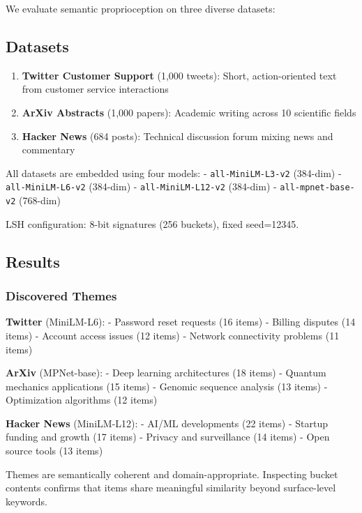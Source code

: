 \documentclass[
]{article}
\providecommand{\tightlist}{%
  \setlength{\itemsep}{0pt}\setlength{\parskip}{0pt}}
\begin{document}
We evaluate semantic proprioception on three diverse datasets:

\subsection{Datasets}\label{datasets}

\begin{enumerate}
\def\labelenumi{\arabic{enumi}.}
\tightlist
\item
  \textbf{Twitter Customer Support} (1,000 tweets): Short,
  action-oriented text from customer service interactions
\item
  \textbf{ArXiv Abstracts} (1,000 papers): Academic writing across 10
  scientific fields
\item
  \textbf{Hacker News} (684 posts): Technical discussion forum mixing
  news and commentary
\end{enumerate}

All datasets are embedded using four models: - \texttt{all-MiniLM-L3-v2}
(384-dim) - \texttt{all-MiniLM-L6-v2} (384-dim) -
\texttt{all-MiniLM-L12-v2} (384-dim) - \texttt{all-mpnet-base-v2}
(768-dim)

LSH configuration: 8-bit signatures (256 buckets), fixed seed=12345.

\subsection{Results}\label{results}

\subsubsection{Discovered Themes}\label{discovered-themes}

\textbf{Twitter} (MiniLM-L6): - Password reset requests (16 items) -
Billing disputes (14 items) - Account access issues (12 items) - Network
connectivity problems (11 items)

\textbf{ArXiv} (MPNet-base): - Deep learning architectures (18 items) -
Quantum mechanics applications (15 items) - Genomic sequence analysis
(13 items) - Optimization algorithms (12 items)

\textbf{Hacker News} (MiniLM-L12): - AI/ML developments (22 items) -
Startup funding and growth (17 items) - Privacy and surveillance (14
items) - Open source tools (13 items)

Themes are semantically coherent and domain-appropriate. Inspecting
bucket contents confirms that items share meaningful similarity beyond
surface-level keywords.
\end{document}

